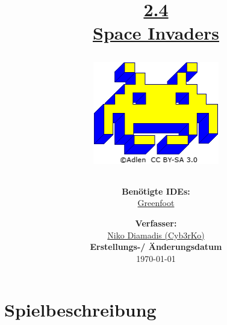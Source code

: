 \documentclass{scrartcl}   %
\begin{document}
\title{\huge{\href{https://www.inf-schule.de/oop/java/implementierung/spaceinvaders}{2.4\\Space Invaders}}\\
\vspace{0.5cm}
\begin{figure}[ht]
	\centering
	\href{https://creativecommons.org/licenses/by-sa/3.0/de/}{\includegraphics[height=4.5cm]{Space_Invaders.png}}
\end{figure}
\vspace{0.7cm}}

\author{\textbf{Benötigte IDEs:}\\
\href{https://www.greenfoot.org/}{Greenfoot}
\vspace{1cm}}

\date{\textbf{Verfasser:}\\
\href{https://cyb3rko.de}{Niko Diamadis (Cyb3rKo)}\\
\vspace{1cm}
\textbf{Erstellungs-/ Änderungsdatum}\\
\today\enlargethispage{4cm}}

\doublespacing

\maketitle\thispagestyle{empty}

\cleardoublepage

\setcounter{page}{1}
\tableofcontents


\newpage
{}  %

\cleardoublepage

\section{Spielbeschreibung}
\end{document}
